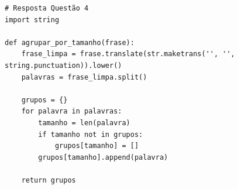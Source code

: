 \ifmostrarGabarito
\begin{verbatim}
# Resposta Questão 4
import string

def agrupar_por_tamanho(frase):
    frase_limpa = frase.translate(str.maketrans('', '', string.punctuation)).lower()
    palavras = frase_limpa.split()
    
    grupos = {}
    for palavra in palavras:
        tamanho = len(palavra)
        if tamanho not in grupos:
            grupos[tamanho] = []
        grupos[tamanho].append(palavra)
        
    return grupos
\end{verbatim}
\fi
